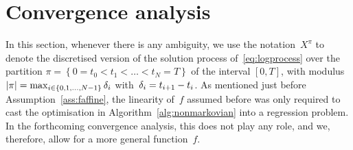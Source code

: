 \section{Convergence analysis}\label{sec:convergence_analysis}
In this section, whenever there is any ambiguity, we use the notation~$X^\pi$ to denote the discretised version of the solution process of~\eqref{eq:logprocess} over the partition $\pi=\left\{0=t_{0}<t_{1}<\ldots<t_{N}=T\right\}$ of the interval $[0, T]$,
with modulus~${|\pi|=\max_{i\in\{0,1,\dots, N-1\}} \delta_{i}}$ with~$\delta_{i} =t_{i+1}-t_{i}$. 
As mentioned just before Assumption~\ref{ass:faffine},
the linearity of~$f$ assumed before was only required to cast the optimisation in Algorithm~\ref{alg:nonmarkovian} into a regression problem.
In the forthcoming convergence analysis, this does not play any role, and we, therefore, allow for a more general function~$f$.

